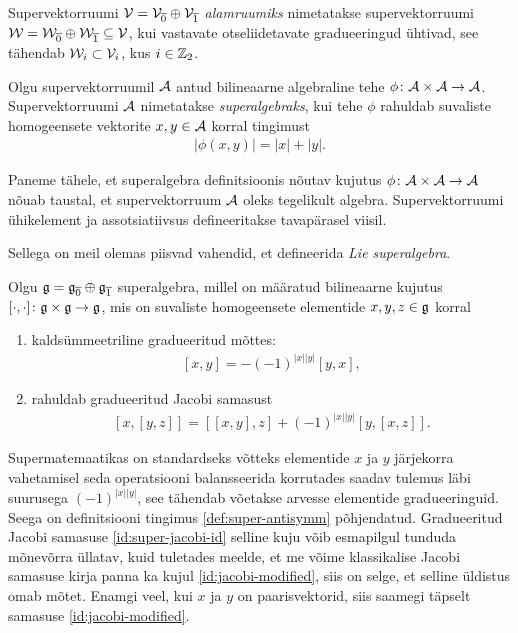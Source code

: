 Supervektorruumi $\mathcal{V} = \mathcal{V}_{\overline{0}} \oplus \mathcal{V}_{\overline{1}}$
\emph{alamruumiks} nimetatakse supervektorruumi
$\mathcal{W} = \mathcal{W}_{\overline{0}} \oplus \mathcal{W}_{\overline{1}} \subseteq \mathcal{V}$, kui
vastavate otseliidetavate gradueeringud ühtivad, see tähendab
$\mathcal{W}_i \subset \mathcal{V}_i$, kus $i \in \mathbb{Z}_2$.

\begin{dfn}
    Olgu supervektorruumil $\mathcal{A}$ antud bilineaarne algebraline tehe
    $\phi \colon \mathcal{A} \times \mathcal{A} \to \mathcal{A}$. Supervektorruumi $\mathcal{A}$ nimetatakse
    \emph{superalgebraks}, kui tehe $\phi$ rahuldab suvaliste homogeensete
    vektorite $x, y \in \mathcal{A}$ korral tingimust
    \begin{align}\label{def:superalgebra-parity}
        \left|\phi(x, y)\right| = |x| + |y|.
    \end{align}
\end{dfn}

Paneme tähele, et superalgebra definitsioonis nõutav kujutus
$\phi \colon \mathcal{A} \times \mathcal{A} \to \mathcal{A}$ nõuab taustal, et supervektorruum
$\mathcal{A}$ oleks tegelikult algebra. Supervektorruumi ühikelement ja
assotsiatiivsus defineeritakse tavapärasel viisil.

Sellega on meil olemas piisvad vahendid, et defineerida
\emph{Lie superalgebra}.

\begin{dfn}
    Olgu $\mathfrak{g} = \mathfrak{g}_{\overline{0}} \oplus \mathfrak{g}_{\overline{1}}$ superalgebra,
    millel on määratud bilineaarne kujutus
    $[\cdot, \cdot] \colon \mathfrak{g} \times \mathfrak{g} \to \mathfrak{g}$, mis on suvaliste
    homogeensete elementide $x, y, z \in \mathfrak{g}$ korral
    \begin{enumerate}
        \item kaldsümmeetriline gradueeritud mõttes:
            \begin{align}\label{def:super-antisymm}
                [x, y] = -(-1)^{|x||y|}[y, x],
            \end{align}
        \item rahuldab gradueeritud Jacobi samasust
            \begin{align}\label{id:super-jacobi-id}
                [x, [y, z]] = [[x, y], z] + (-1)^{|x||y|}[y, [x, z]].
            \end{align}
    \end{enumerate}
\end{dfn}

Supermatemaatikas on standardseks võtteks elementide $x$ ja $y$ järjekorra
vahetamisel seda operatsiooni balansseerida korrutades saadav tulemus
läbi suurusega $(-1)^{|x||y|}$, see tähendab võetakse arvesse elementide
gradueeringuid.
Seega on definitsiooni tingimus \eqref{def:super-antisymm} põhjendatud.
Gradueeritud Jacobi samasuse \eqref{id:super-jacobi-id} selline kuju võib
esmapilgul tunduda mõnevõrra üllatav, kuid tuletades meelde, et me võime
klassikalise Jacobi samasuse kirja panna ka kujul \eqref{id:jacobi-modified},
siis on selge, et selline üldistus omab mõtet. Enamgi veel, kui $x$ ja $y$ on
paarisvektorid, siis saamegi täpselt samasuse \eqref{id:jacobi-modified}.

